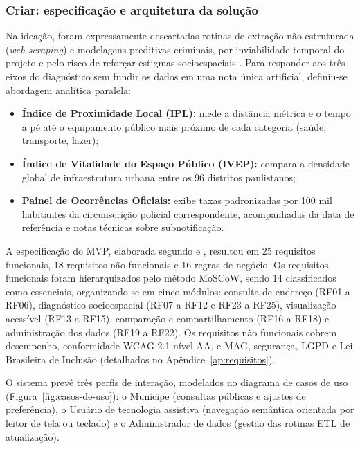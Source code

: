 \documentclass[
    12pt,
    oneside,            %
    a4paper,
    brazilian
    ]{abntex2}
\begin{document}
\subsubsection{Criar: especificação e arquitetura da solução}

Na ideação, foram expressamente descartadas rotinas de extração não estruturada (\emph{web scraping}) e modelagens preditivas criminais, por inviabilidade temporal do projeto e pelo risco de reforçar estigmas socioespaciais \cite{caldeira2000}. Para responder aos três eixos do diagnóstico sem fundir os dados em uma nota única artificial, definiu-se abordagem analítica paralela:

\begin{itemize}
  \item \textbf{Índice de Proximidade Local (IPL):} mede a distância métrica e o tempo a pé até o equipamento público mais próximo de cada categoria (saúde, transporte, lazer);
  \item \textbf{Índice de Vitalidade do Espaço Público (IVEP):} compara a densidade global de infraestrutura urbana entre os 96 distritos paulistanos;
  \item \textbf{Painel de Ocorrências Oficiais:} exibe taxas padronizadas por 100 mil habitantes da circunscrição policial correspondente, acompanhadas da data de referência e notas técnicas sobre subnotificação.
\end{itemize}

A especificação do MVP, elaborada segundo  e , resultou em 25 requisitos funcionais, 18 requisitos não funcionais e 16 regras de negócio. Os requisitos funcionais foram hierarquizados pelo método MoSCoW, sendo 14 classificados como essenciais, organizando-se em cinco módulos: consulta de endereço (RF01 a RF06), diagnóstico socioespacial (RF07 a RF12 e RF23 a RF25), visualização acessível (RF13 a RF15), comparação e compartilhamento (RF16 a RF18) e administração dos dados (RF19 a RF22). Os requisitos não funcionais cobrem desempenho, conformidade WCAG 2.1 nível AA, e-MAG, segurança, LGPD e Lei Brasileira de Inclusão (detalhados no Apêndice~\ref{ap:requisitos}).

O sistema prevê três perfis de interação, modelados no diagrama de casos de uso (Figura~\ref{fig:casos-de-uso}): o Munícipe (consultas públicas e ajustes de preferência), o Usuário de tecnologia assistiva (navegação semântica orientada por leitor de tela ou teclado) e o Administrador de dados (gestão das rotinas ETL de atualização).
\end{document}

